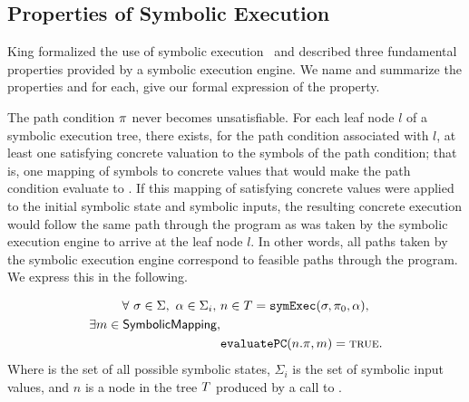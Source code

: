 \subsection{Properties of Symbolic Execution}
King formalized the use of symbolic execution~\cite{king1976symbolic} and
described three fundamental
properties provided by a symbolic execution engine. We name and summarize the properties
and for each, give our formal expression of the property.
\setcounter{property}{0}
\renewcommand{\theproperty}{K.\arabic{property}}
\begin{property}
  \label{prop:kingsound}
  The path condition $\pi$ never becomes unsatisfiable. For each
  leaf node $l$ of a symbolic execution tree, there exists, for the path condition
  associated with $l$, at
  least one satisfying concrete valuation to the symbols of the path
  condition; that is, one mapping of symbols to concrete values that
  would make the path condition evaluate to \texttrue. If this mapping of satisfying concrete values were
  applied to the initial symbolic state and symbolic inputs, the resulting
  concrete execution would follow the same path through the program as was taken
  by the symbolic execution engine to arrive at the leaf node $l$. In other
  words, all paths taken by the symbolic execution engine correspond to feasible
  paths through the program. We express this in the following. 
  

  \begin{align*}
    \forall ~\sigma \in \Sigma,~\alpha \in \Sigma_i,~& n \in T = \mathtt{symExec}(\sigma,\pi_0,\alpha), \\
     \exists m \in \textsf{SymbolicMapping}, \\
    & \mathtt{evaluatePC}(n.\pi,m) = \mathtt{\textsc{true}}.
  \end{align*}
  Where \symstates{} is the set of all
  possible symbolic states, $\Sigma_i$ is the set of symbolic input values, and $n$ is a node in the tree $T$ produced by a call
  to \symexecution.
\end{property}


